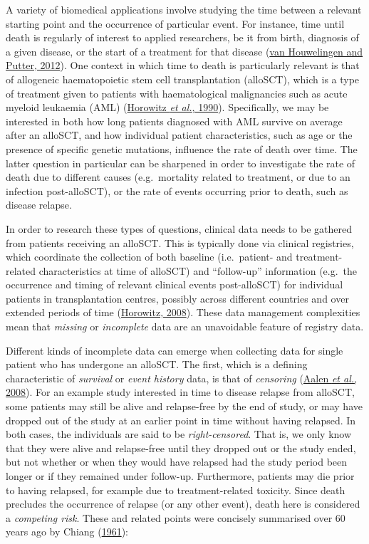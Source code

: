 \documentclass[
  letterpaper,
  DIV=11,
  numbers=noendperiod]{scrreprt}
\begin{document}
A variety of biomedical applications involve studying the time between a
relevant starting point and the occurrence of particular event. For
instance, time until death is regularly of interest to applied
researchers, be it from birth, diagnosis of a given disease, or the
start of a treatment for that disease
(\protect\hyperlink{ref-vanhouwelingenDynamicPredictionClinical2012}{van
Houwelingen and Putter, 2012}). One context in which time to death is
particularly relevant is that of allogeneic haematopoietic stem cell
transplantation (alloSCT), which is a type of treatment given to
patients with haematological malignancies such as acute myeloid
leukaemia (AML)
(\protect\hyperlink{ref-horowitzGraftversusleukemiaReactionsBone1990}{Horowitz
\emph{et al.}, 1990}). Specifically, we may be interested in both how
long patients diagnosed with AML survive on average after an alloSCT,
and how individual patient characteristics, such as age or the presence
of specific genetic mutations, influence the rate of death over time.
The latter question in particular can be sharpened in order to
investigate the rate of death due to different causes (e.g.~mortality
related to treatment, or due to an infection post-alloSCT), or the rate
of events occurring prior to death, such as disease relapse.

In order to research these types of questions, clinical data needs to be
gathered from patients receiving an alloSCT. This is typically done via
clinical registries, which coordinate the collection of both baseline
(i.e.~patient- and treatment-related characteristics at time of alloSCT)
and ``follow-up'' information (e.g.~the occurrence and timing of
relevant clinical events post-alloSCT) for individual patients in
transplantation centres, possibly across different countries and over
extended periods of time
(\protect\hyperlink{ref-horowitzRoleRegistriesFacilitating2008}{Horowitz,
2008}). These data management complexities mean that \emph{missing} or
\emph{incomplete} data are an unavoidable feature of registry data.

Different kinds of incomplete data can emerge when collecting data for
single patient who has undergone an alloSCT. The first, which is a
defining characteristic of \emph{survival} or \emph{event history} data,
is that of \emph{censoring} (\protect\hyperlink{ref-Aalen2008}{Aalen
\emph{et al.}, 2008}). For an example study interested in time to
disease relapse from alloSCT, some patients may still be alive and
relapse-free by the end of study, or may have dropped out of the study
at an earlier point in time without having relapsed. In both cases, the
individuals are said to be \emph{right-censored}. That is, we only know
that they were alive and relapse-free until they dropped out or the
study ended, but not whether or when they would have relapsed had the
study period been longer or if they remained under follow-up.
Furthermore, patients may die prior to having relapsed, for example due
to treatment-related toxicity. Since death precludes the occurrence of
relapse (or any other event), death here is considered a \emph{competing
risk}. These and related points were concisely summarised over 60 years
ago by Chiang
(\protect\hyperlink{ref-chiangStochasticStudyLife1961}{1961}):
\end{document}
